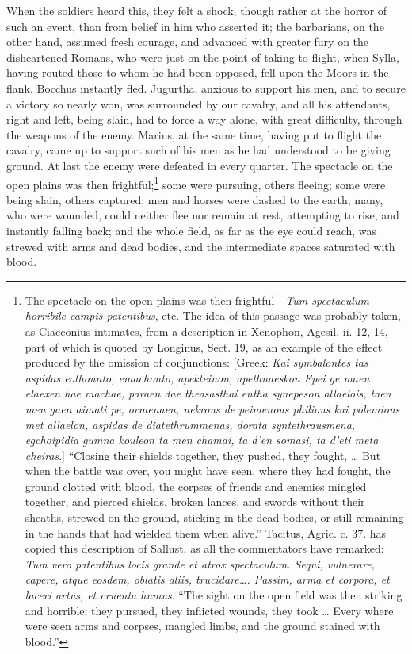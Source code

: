 When the soldiers heard this, they felt a shock, though rather at the
horror of such an event, than from belief in him who asserted it; the
barbarians, on the other hand, assumed fresh courage, and advanced
with greater fury on the disheartened Romans, who were just on the
point of taking to flight, when Sylla, having routed those to whom he
had been opposed, fell upon the Moors in the flank. Bocchus instantly
fled. Jugurtha, anxious to support his men, and to secure a victory so
nearly won, was surrounded by our cavalry, and all his attendants,
right and left, being slain, had to force a way alone, with great
difficulty, through the weapons of the enemy. Marius, at the same
time, having put to flight the cavalry, came up to support such of his
men as he had understood to be giving ground. At last the enemy were
defeated in every quarter. The spectacle on the open plains was then
frightful;\footnote{The spectacle on the open plains was then frightful—\emph{Tum
spectaculum horribile campis patentibus}, etc. The idea of this
passage was probably taken, as Ciacconius intimates, from a
description in Xenophon, Agesil. ii. 12, 14, part of which is quoted
by Longinus, Sect. 19, as an example of the effect produced by the
omission of conjunctions: [Greek: \emph{Kai symbalontes tas aspidas
eothounto, emachonto, apekteinon, apethnaeskon Epei ge maen elaexen
hae machae, paraen dae theasasthai entha synepeson allaelois, taen men
gaen aimati pe, ormenaen, nekrous de peimenous philious kai polemious
met allaelon, aspidas de diatethrummenas, dorata syntethrausmena,
egchoipidia gumna kouleon ta men chamai, ta d'en somasi, ta d'eti meta
cheiras}.] ``Closing their shields together, they pushed, they fought,
… But when the battle was over, you might have seen, where they had
fought, the ground clotted with blood, the corpses of friends and
enemies mingled together, and pierced shields, broken lances, and
swords without their sheaths, strewed on the ground, sticking in the
dead bodies, or still remaining in the hands that had wielded them
when alive.'' Tacitus, Agric. c. 37. has copied this description of
Sallust, as all the commentators have remarked: \emph{Tum vero patentibus
locis grande et atrox spectaculum. Sequi, vulnerare, capere, atque
eosdem, oblatis aliis, trucidare…. Passim, arma et corpora, et
laceri artus, et cruenta humus}. ``The sight on the open field was then
striking and horrible; they pursued, they inflicted wounds, they took
… Every where were seen arms and corpses, mangled limbs, and the
ground stained with blood.''} some were pursuing, others fleeing; some were being
slain, others captured; men and horses were dashed to the earth; many,
who were wounded, could neither flee nor remain at rest, attempting to
rise, and instantly falling back; and the whole field, as far as the
eye could reach, was strewed with arms and dead bodies, and the
intermediate spaces saturated with blood.

